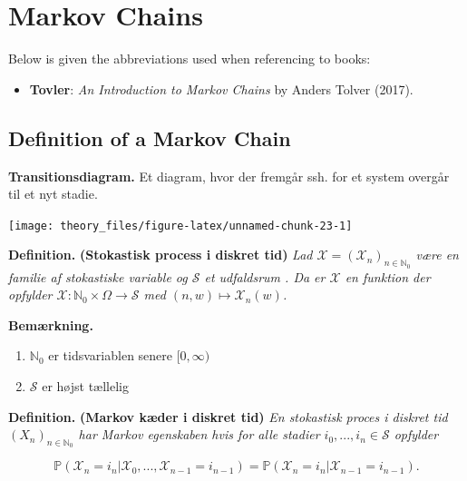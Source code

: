 \documentclass[a4paper,12pt,openany]{book}
\providecommand{\tightlist}{%
 \setlength{\itemsep}{0pt}\setlength{\parskip}{0pt}}
\begin{document}
\hypertarget{markov-chains}{%
\chapter{Markov Chains}\label{markov-chains}}

Below is given the abbreviations used when referencing to books:

\begin{itemize}
\tightlist
\item
  \textbf{Tovler}: \emph{An Introduction to Markov Chains} by Anders Tolver (2017).\cite{tovler2017}
\end{itemize}

\hypertarget{definition-of-a-markov-chain}{%
\section{Definition of a Markov Chain}\label{definition-of-a-markov-chain}}

\textbf{Transitionsdiagram.} Et diagram, hvor der fremgår ssh. for et system overgår til et nyt stadie.

\begin{center}\texttt{[image: theory\_files/figure-latex/unnamed-chunk-23-1]} \end{center}

\textbf{Definition.} \textbf{(Stokastisk process i diskret tid)} \emph{Lad \(\mathcal{X}=(\mathcal{X}_n)_{n\in\mathbb{N}_0}\) være en familie af stokastiske variable og \(\mathcal{S}\) et udfaldsrum . Da er \(\mathcal{X}\) en funktion der opfylder \(\mathcal{X} : \mathbb{N}_0\times \Omega \to \mathcal{S}\) med \((n,w) \mapsto \mathcal{X}_n(w)\).}

\textbf{Bemærkning.}

\begin{enumerate}
\def\labelenumi{\roman{enumi}.}
\tightlist
\item
  \(\mathbb{N}_0\) er tidsvariablen senere \([0,\infty)\)
\item
  \(\mathcal{S}\) er højst tællelig
\end{enumerate}

\textbf{Definition.} \textbf{(Markov kæder i diskret tid)} \emph{En stokastisk proces i diskret tid \((X_n)_{n\in\mathbb{N}_0}\) har \textit{Markov egenskaben} hvis for alle stadier \(i_0,...,i_n\in\mathcal{S}\) opfylder}

\[
\mathbb{P}(\mathcal{X}_n=i_n\vert \mathcal{X}_0,...,\mathcal{X}_{n-1}=i_{n-1})=\mathbb{P}(\mathcal{X}_n=i_n \vert \mathcal{X}_{n-1}=i_{n-1}).
\]
\end{document}

